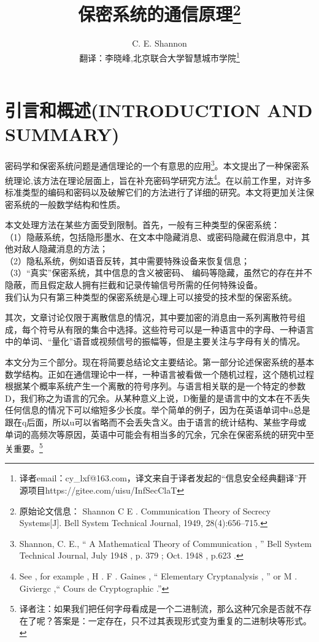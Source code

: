 \documentclass[]{article}
\title{保密系统的通信原理\footnote{原始论文信息： Shannon C E . Communication Theory of Secrecy Systems[J]. Bell System Technical Journal, 1949, 28(4):656–715.}}
\author{C. E. Shannon\\
{\small  翻译：李晓峰,北京联合大学智慧城市学院\footnote{译者email：cy\_lxf@163.com，译文来自于译者发起的“信息安全经典翻译”开源项目https://gitee.com/uisu/InfSecClaT}}
}
\begin{document}
	
\maketitle
	
\newpage
\tableofcontents
\newpage

%   
%
	
	\section{引言和概述(INTRODUCTION AND SUMMARY)}
	密码学和保密系统问题是通信理论的一个有意思的应用\footnote{Shannon, C. E., “ A Mathematical Theory of Communication , ”
	Bell System Technical Journal, July 1948 , p. 379 ; Oct. 1948 , p.623 .}。本文提出了一种保密系统理论,该方法在理论层面上，旨在补充密码学研究方法\footnote{See , for example , H . F . Gaines , “ Elementary Cryptanalysis , ” or M . Giviergc ,“ Cours de Cryptographic .”}。在以前工作里，对许多标准类型的编码和密码以及破解它们的方法进行了详细的研究。本文将更加关注保密系统的一般数学结构和性质。\par


本文处理方法在某些方面受到限制。首先，一般有三种类型的保密系统：\\
（1）隐蔽系统，包括隐形墨水、在文本中隐藏消息、或密码隐藏在假消息中，其他对敌人隐藏消息的方法；\\
（2）隐私系统，例如语音反转，其中需要特殊设备来恢复信息；\\
（3）“真实”保密系统，其中信息的含义被密码、
编码等隐藏，虽然它的存在并不隐蔽，而且假定敌人拥有拦截和记录传输信号所需的任何特殊设备。\\
我们认为只有第三种类型的保密系统是心理上可以接受的技术型的保密系统。
\par

其次，文章讨论仅限于离散信息的情况，其中要加密的消息由一系列离散符号组成，每个符号从有限的集合中选择。这些符号可以是一种语言中的字母、一种语言中的单词、“量化”语音或视频信号的振幅等，但是主要关注与字母有关的情况。
\par

本文分为三个部分。现在将简要总结论文主要结论。第一部分论述保密系统的基本数学结构。正如在通信理论中一样，一种语言被看做一个随机过程，这个随机过程根据某个概率系统产生一个离散的符号序列。与语言相关联的是一个特定的参数D，我们称之为语言的冗余。从某种意义上说，D衡量的是语言中的文本在不丢失任何信息的情况下可以缩短多少长度。举个简单的例子，因为在英语单词中u总是跟在q后面，所以u可以省略而不会丢失含义。由于语言的统计结构、某些字母或单词的高频次等原因，英语中可能会有相当多的冗余，冗余在保密系统的研究中至关重要。\footnote{译者注：如果我们把任何字母看成是一个二进制流，那么这种冗余是否就不存在了呢？答案是：一定存在，只不过其表现形式变为重复的二进制块等形式。}
\par
\end{document}
